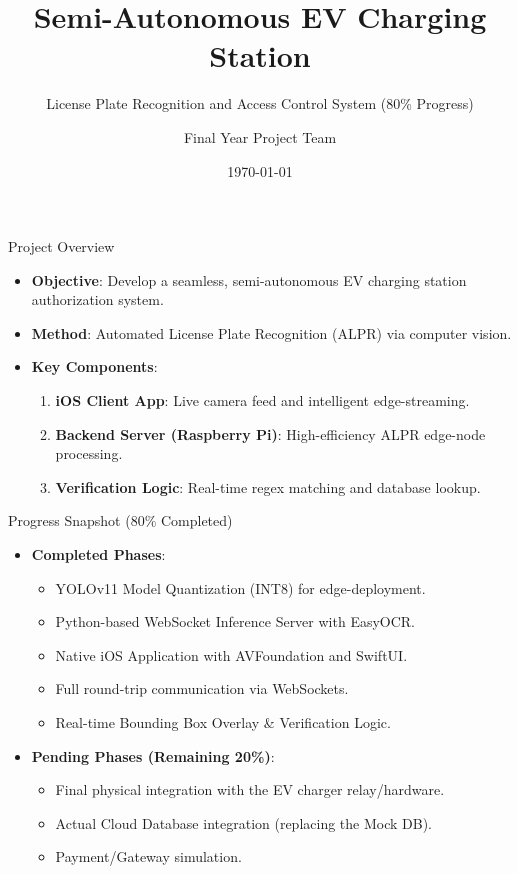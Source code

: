 \documentclass{beamer}
\title{Semi-Autonomous EV Charging Station}
\subtitle{License Plate Recognition and Access Control System (80\% Progress)}
\author{Final Year Project Team}
\date{\today}
\begin{document}
\begin{frame}
    \titlepage
\end{frame}

\begin{frame}{Project Overview}
    \begin{itemize}
        \item \textbf{Objective}: Develop a seamless, semi-autonomous EV charging station authorization system.
        \item \textbf{Method}: Automated License Plate Recognition (ALPR) via computer vision.
        \item \textbf{Key Components}:
        \begin{enumerate}
            \item \textbf{iOS Client App}: Live camera feed and intelligent edge-streaming.
            \item \textbf{Backend Server (Raspberry Pi)}: High-efficiency ALPR edge-node processing.
            \item \textbf{Verification Logic}: Real-time regex matching and database lookup.
        \end{enumerate}
    \end{itemize}
\end{frame}

\begin{frame}{Progress Snapshot (80\% Completed)}
    \begin{itemize}
        \item \textbf{Completed Phases}:
        \begin{itemize}
            \item YOLOv11 Model Quantization (INT8) for edge-deployment.
            \item Python-based WebSocket Inference Server with EasyOCR.
            \item Native iOS Application with AVFoundation and SwiftUI.
            \item Full round-trip communication via WebSockets.
            \item Real-time Bounding Box Overlay \& Verification Logic.
        \end{itemize}
        \item \textbf{Pending Phases (Remaining 20\%)}:
        \begin{itemize}
            \item Final physical integration with the EV charger relay/hardware.
            \item Actual Cloud Database integration (replacing the Mock DB).
            \item Payment/Gateway simulation.
        \end{itemize}
    \end{itemize}
\end{frame}
\end{document}
